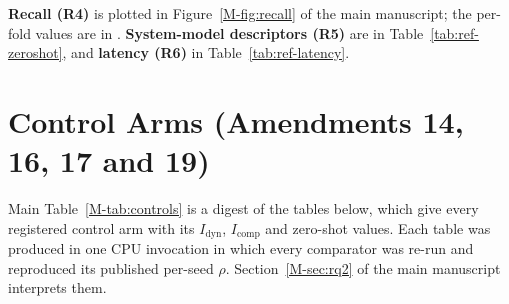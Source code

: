 \documentclass[preprint,3p]{elsarticle}
\begin{document}
\noindent\textbf{Recall (R4)} is plotted in Figure~\ref{M-fig:recall} of the main manuscript; the per-fold values are in . \textbf{System-model descriptors (R5)} are in Table~\ref{tab:ref-zeroshot}, and \textbf{latency (R6)} in Table~\ref{tab:ref-latency}.







\section{Control Arms (Amendments 14, 16, 17 and 19)}
\label{supp:controls}

Main Table~\ref{M-tab:controls} is a digest of the tables below, which give every registered control arm with its $I_{\text{dyn}}$, $I_{\text{comp}}$ and zero-shot values. Each table was produced in one CPU invocation in which every comparator was re-run and reproduced its published per-seed $\rho$. Section~\ref{M-sec:rq2} of the main manuscript interprets them.
\end{document}
